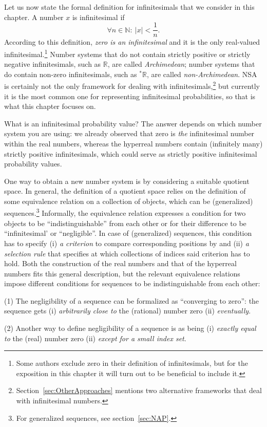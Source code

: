 Let us now state the formal definition for infinitesimals that we consider in this chapter. A number $x$ is infinitesimal if
$$\forall n \in \mathbb{N} : \ |x| < \frac{1}{n}.\label{eq:inf}$$
According to this definition, \emph{zero is an infinitesimal} and it is the only real-valued infinitesimal.\footnote{Some authors exclude zero in their definition of infinitesimals, but for the exposition in this chapter it will turn out to be beneficial to include it.}
Number systems that do not contain strictly positive or strictly negative infinitesimals, such as $\mathbb{R}$, are called \emph{Archimedean}; number systems that do contain non-zero infinitesimals, such as ${^*} \mathbb{R}$, are called \emph{non-Archimedean}. NSA is certainly not the only framework for dealing with infinitesimals,\footnote{Section~\ref{sec:OtherApproaches} mentions two alternative frameworks that deal with infinitesimal numbers.} but currently it is the most common one for representing infinitesimal probabilities, so that is what this chapter focuses on.

What is an infinitesimal probability value? The answer depends on which number system you are using: we already observed that zero is \emph{the} infinitesimal number within the real numbers, whereas the hyperreal numbers contain (infinitely many) strictly positive infinitesimals, which could serve as strictly positive infinitesimal probability values.

One way to obtain a new number system is by considering a suitable quotient space. In general, the definition of a quotient space relies on the definition of some equivalence relation on a collection of objects, which can be  (generalized) sequences.\footnote{For generalized sequences, see section~\ref{sec:NAP}.} Informally, the equivalence relation expresses a condition for two objects to be ``indistinguishable'' from each other or for their difference to be ``infinitesimal' or ``negligible''. In case of (generalized) sequences, this condition has to specify (i) \textit{a criterion} to compare corresponding positions by and (ii) \textit{a selection rule} that specifies at which collections of indices said criterion has to hold. Both the construction of the real numbers and that of the hyperreal numbers fits this general description, but the relevant equivalence relations impose different conditions for sequences to be indistinguishable from each other:

\begin{description}
  \item{(1)} The negligibility of a sequence can be formalized as ``converging to zero'': the sequence gets (i) \textit{arbitrarily close to} the (rational) number zero (ii) \textit{eventually}.
  \item{(2)} Another way to define negligibility of a sequence is as being (i) \textit{exactly equal to} the (real) number zero (ii) \textit{except for a small index set}.
\end{description}

